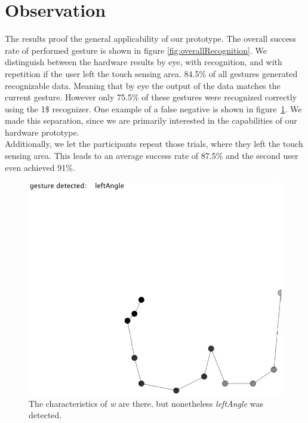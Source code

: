 \section{Observation}
The results proof the general applicability of our prototype. The overall success rate of performed gesture is shown in figure \ref{fig:overallRecognition}. We distinguish between the hardware results by eye, with recognition, and with repetition if the user left the touch sensing area. 84.5\% of all gestures generated recognizable data. Meaning that by eye the output of the data matches the current gesture. However only 75.5\% of these gestures were recognized correctly using the 1\$ recognizer.  One example of a false negative is shown in figure~\ref{fig:falsenegative}. We made this separation, since we are primarily interested in the capabilities of our hardware prototype. \\
Additionally, we let the participants repeat those trials, where they  left the touch sensing area. This leads to an average success rate of 87.5\% and the second user even achieved 91\%.
\begin{figure}
\includegraphics[scale=0.35]{images/falsenegative.jpg}
\caption{The characteristics of \emph{w} are there, but nonetheless \emph{leftAngle} was detected.}
\label{fig:falsenegative}
\end{figure}
